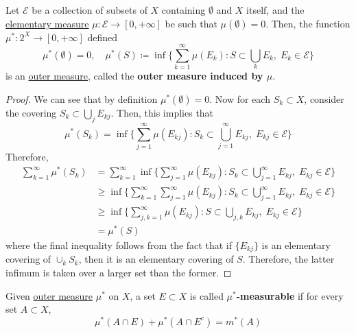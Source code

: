   \begin{theorem}
    \label{thm:outer-measure-induced-by-elementary-measure}
    Let $\mathcal{E}$ be a collection of subsets of $X$ containing $\emptyset$ and $X$ itself, and the \hyperref[def:elementary-measure]{elementary measure} $\mu: \mathcal{E} \to [0, +\infty]$ be such that $\mu(\emptyset) = 0$. Then, the function $\mu^\ast : 2^X \to [0, +\infty]$ defined 
    \begin{equation}
			\mu^\ast(\emptyset) = 0, \quad \mu^\ast (S) \coloneqq \inf \bigg\{ \sum_{k=1}^\infty \mu(E_k) \colon S \subset \bigcup_k E_k, \; E_k \in \mathcal{E} \bigg\}
    \end{equation}
		is an \hyperref[def:outer-measure]{outer measure}, called the \textbf{outer measure induced by $\mu$}. 
  \end{theorem}
  \begin{proof}
		We can see that by definition $\mu^\ast (\emptyset) = 0$. Now for each $S_k \subset X$, consider the covering $S_k \subset \bigcup_j E_{kj}$. Then, this implies that 
		\begin{equation}
			\mu^\ast (S_k) = \inf \bigg\{ \sum_{j=1}^\infty \mu(E_{kj}) \colon S_k \subset \bigcup_{j=1}^\infty E_{kj}, \; E_{kj} \in \mathcal{E} \bigg\}
		\end{equation}
		Therefore, 
		\begin{align}
			\sum_{k=1}^\infty \mu^\ast (S_k) 
				& = \sum_{k=1}^\infty \inf \bigg\{ \sum_{j=1}^\infty \mu(E_{kj}) \colon S_k \subset \bigcup_{j=1}^\infty E_{kj}, \; E_{kj} \in \mathcal{E} \bigg\} \\ 
				& \geq \inf \bigg\{ \sum_{k=1}^\infty \sum_{j=1}^\infty \mu(E_{kj}) \colon S_k \subset \bigcup_{j=1}^\infty E_{kj}, \; E_{kj} \in \mathcal{E} \bigg\} \\ 
				& \geq \inf \bigg\{ \sum_{j, k = 1}^\infty \mu(E_{kj}) \colon S \subset \bigcup_{j, k} E_{kj}, \; E_{kj} \in \mathcal{E} \bigg\} \\ 
				& = \mu^\ast (S)
		\end{align}
		where the final inequality follows from the fact that if $\{E_{kj}\}$ is an elementary covering of $\cup_k S_k$, then it is an elementary covering of $S$. Therefore, the latter infimum is taken over a larger set than the former. 
  \end{proof}

  \begin{definition}
    \label{def:caratheodorys-criterion}
    Given \hyperref[def:outer-measure]{outer measure} $\mu^\ast$ on $X$, a set $E \subset X$  is called \textbf{$\mu^\ast$-measurable} if for every set $A \subset X$, 
    \begin{equation}
      \mu^\ast (A \cap E) + \mu^\ast (A \cap E^c) = m^\ast (A) 
    \end{equation}
  \end{definition} 

